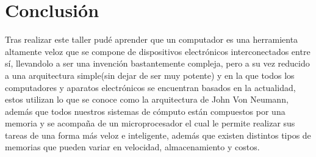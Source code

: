 \documentclass{article}
\begin{document}
\section{Conclusión} \label{conclulsion}
\noindent
Tras realizar este taller pudé aprender que un computador es una herramienta altamente veloz que se compone de dispositivos electrónicos interconectados entre sí, llevandolo a ser una invención bastantemente compleja, pero a su vez reducido a una arquitectura simple(sin dejar de ser muy potente) y en la que todos los computadores y aparatos electrónicos se encuentran basados en la actualidad, estos utilizan  lo que se conoce como la arquitectura de John Von Neumann, además que todos nuestros sistemas de cómputo están compuestos por una memoria y se acompaña de un microprocesador el cual le permite realizar sus tareas de una forma más veloz e inteligente, además que existen distintos tipos de memorias que pueden variar en velocidad, almacenamiento y costos.



\end{document}
